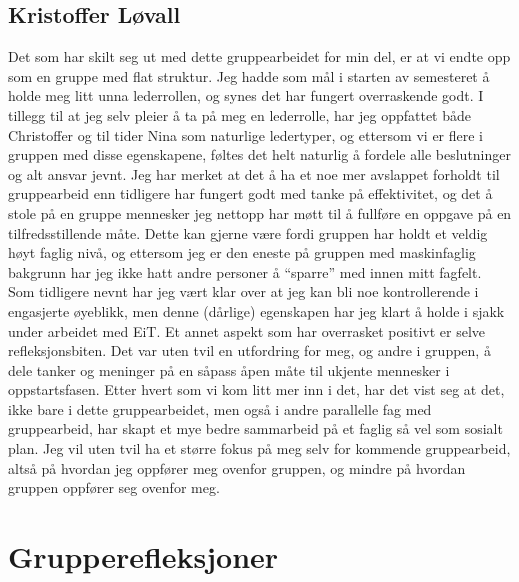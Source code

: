 \subsection*{Kristoffer Løvall}
Det som har skilt seg ut med dette gruppearbeidet for min del, er at vi endte opp som en gruppe med flat struktur. Jeg hadde som mål i starten av 
semesteret å holde meg litt unna lederrollen, og synes det har fungert overraskende godt. I tillegg til at jeg selv pleier å ta på meg en lederrolle, har 
jeg oppfattet både Christoffer og til tider Nina som naturlige ledertyper, og ettersom vi er flere i gruppen med disse egenskapene, føltes det helt 
naturlig å fordele alle beslutninger og alt ansvar jevnt. Jeg har merket at det å ha et noe mer avslappet forholdt til gruppearbeid enn tidligere har 
fungert godt med tanke på effektivitet, og det å stole på en gruppe mennesker jeg nettopp har møtt til å fullføre en oppgave på en 
tilfredsstillende måte. Dette kan gjerne være fordi gruppen har holdt et veldig høyt faglig nivå, og ettersom jeg er den eneste på gruppen med 
maskinfaglig bakgrunn har jeg ikke hatt andre personer å “sparre” med innen mitt fagfelt. Som tidligere nevnt har jeg vært klar over at jeg kan bli 
noe kontrollerende i engasjerte øyeblikk, men denne (dårlige) egenskapen har jeg klart å holde i sjakk under arbeidet med EiT. Et annet aspekt som 
har overrasket positivt er selve refleksjonsbiten. Det var uten tvil en utfordring for meg, og andre i gruppen, å dele tanker og meninger på en 
såpass åpen måte til ukjente mennesker i oppstartsfasen. Etter hvert som vi kom litt mer inn i det, har det vist seg at det, ikke bare i dette 
gruppearbeidet, men også i andre parallelle fag med gruppearbeid, har skapt et mye bedre sammarbeid på et faglig så vel som sosialt plan. Jeg vil 
uten tvil ha et større fokus på meg selv for kommende gruppearbeid, altså på hvordan jeg oppfører meg ovenfor gruppen, og mindre på hvordan 
gruppen oppfører seg ovenfor meg.



\section{Grupperefleksjoner}